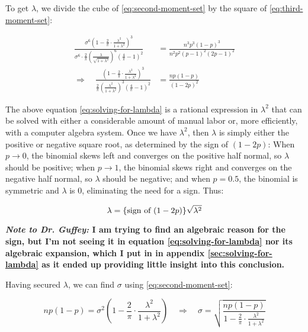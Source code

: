 \documentclass{article}
\begin{document}
To get $\lambda$, we divide the cube of \eqref{eq:second-moment-set} by the
square of \eqref{eq:third-moment-set}:

\begin{align}
  \frac{\sigma^6 \left( 1 - \frac{2}{\pi} \cdot \frac{\lambda^2}{1 + \lambda^2} \right)^3}{\sigma^6 \cdot \frac{2}{\pi} \left( \frac{\lambda}{\sqrt{1 + \lambda^2}} \right)^6 \left(
    \frac{4}{\pi} - 1 \right)^2} &= \frac{n^3p^3(1-p)^3}{n^2p^2(p-1)^2(2p-1)^2} \nonumber \\
  \Rightarrow \quad \frac{\left( 1 - \frac{2}{\pi} \cdot \frac{\lambda^2}{1+\lambda^2} \right)^3}{\frac{2}{\pi} \left( \frac{\lambda^2}{1+\lambda^2} \right)^3 \left( \frac{4}{\pi} - 1
    \right)^2} &= \frac{np(1-p)}{(1-2p)^2} \label{eq:solving-for-lambda}
\end{align}

The above equation \eqref{eq:solving-for-lambda} is a rational expression in
$\lambda^2$ that can be solved with either a considerable amount of manual
labor or, more efficiently, with a computer algebra system. Once we have
$\lambda^2$, then $\lambda$ is simply either the positive or negative square
root, as determined by the sign of $(1-2p)$: When $p \rightarrow 0$, the
binomial skews left and converges on the positive half normal, so $\lambda$
should be positive; when $p \rightarrow 1$, the binomial skews right and
converges on the negative half normal, so $\lambda$ should be negative; and
when $p = 0.5$, the binomial is symmetric and $\lambda$ is 0, eliminating the
need for a sign. Thus:

\begin{equation}
  \label{eq:lambda-solved}
  \lambda = \textnormal{\{sign of $(1-2p)$\}} \sqrt{\lambda^2}
\end{equation}

\textbf{\textit{Note to Dr. Guffey:} I am trying to find an algebraic reason
for the sign, but I'm not seeing it in equation \eqref{eq:solving-for-lambda}
nor its algebraic expansion, which I put in in appendix
\ref{sec:solving-for-lambda} as it ended up providing little insight into this
conclusion.}

Having secured $\lambda$, we can find $\sigma$ using
\eqref{eq:second-moment-set}:

\begin{equation}
  \label{eq:sigma-solved}
  np(1-p) = \sigma^2 \left( 1 - \frac{2}{\pi} \cdot \frac{\lambda^2}{1 + \lambda^2} \right) \quad\Rightarrow\quad
  \sigma = \sqrt{\frac{np(1-p)}{1 - \frac{2}{\pi} \cdot \frac{\lambda^2}{1 + \lambda^2}}}
\end{equation}
\end{document}
